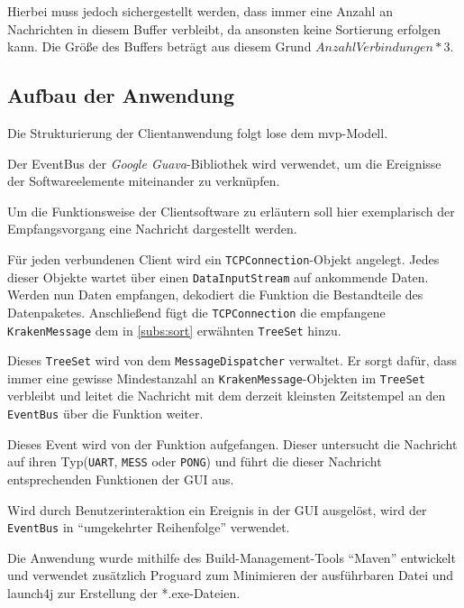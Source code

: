 Hierbei muss jedoch sichergestellt werden, dass immer eine Anzahl an Nachrichten
in diesem Buffer verbleibt, da ansonsten keine Sortierung erfolgen kann. Die
Größe des Buffers beträgt aus diesem Grund $\mathit{AnzahlVerbindungen}*3$.

\subsection{Aufbau der Anwendung}
Die Strukturierung der Clientanwendung folgt lose dem \gls{mvp}-Modell.

Der EventBus der \emph{Google Guava}-Bibliothek\cite{GOOG} wird verwendet, um
die Ereignisse der Softwareelemente miteinander zu verknüpfen. 

Um die Funktionsweise der Clientsoftware zu erläutern soll hier exemplarisch der
Empfangsvorgang eine Nachricht dargestellt werden.

Für jeden verbundenen Client wird ein \texttt{TCPConnection}-Objekt angelegt.
Jedes dieser Objekte wartet über einen \texttt{DataInputStream} auf ankommende
Daten. Werden nun Daten empfangen, dekodiert die Funktion
 die Bestandteile des Datenpaketes.
Anschließend fügt die \texttt{TCPConnection} die
empfangene \texttt{KrakenMessage} dem in \autoref{subs:sort} erwähnten
\texttt{TreeSet} hinzu.

Dieses \texttt{TreeSet} wird von dem \texttt{MessageDispatcher} verwaltet. Er
sorgt dafür, dass immer eine gewisse Mindestanzahl an
\texttt{KrakenMessage}-Objekten im \texttt{TreeSet} verbleibt und
leitet die Nachricht mit dem derzeit kleinsten Zeitstempel an den
\texttt{EventBus} über die Funktion  weiter.

Dieses Event wird von der Funktion 
aufgefangen. Dieser untersucht die Nachricht auf ihren
Typ(\texttt{UART}, \texttt{MESS} oder \texttt{PONG}) und führt die
dieser Nachricht entsprechenden Funktionen der GUI aus.

Wird durch Benutzerinteraktion ein Ereignis in der GUI ausgelöst, wird der
\texttt{EventBus} in "`umgekehrter Reihenfolge"' verwendet. 

Die Anwendung wurde mithilfe des Build-Management-Tools "`Maven"'\cite{MVN}
entwickelt und verwendet zusätzlich Proguard\cite{PROG} zum Minimieren der
ausführbaren Datei und launch4j\cite{L4J} zur Erstellung der *.exe-Dateien.

